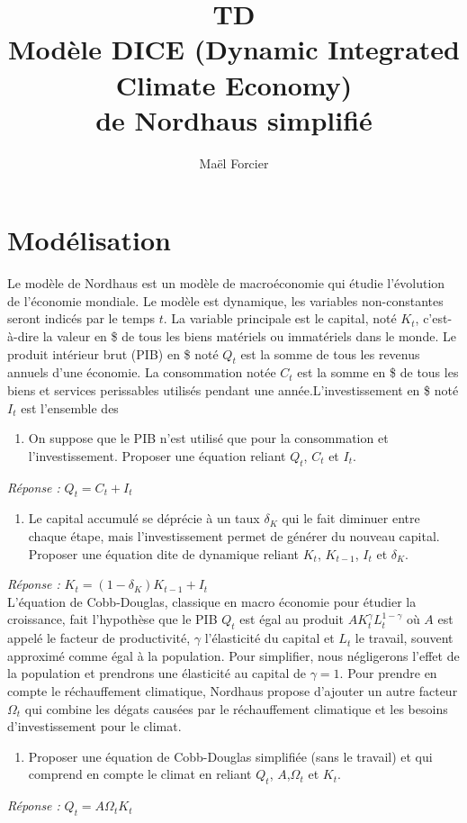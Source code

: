 \documentclass[12pt]{article}
\title{TD \\Modèle 
DICE (Dynamic Integrated Climate Economy) \\
de Nordhaus simplifié }
\author{Maël Forcier}
\theoremstyle{remark}
\begin{document}
\maketitle


\section{Modélisation}

Le modèle de Nordhaus est un modèle de macroéconomie qui étudie l'évolution de l'économie mondiale. Le modèle est dynamique, les variables non-constantes seront indicés par le temps $t$. La variable principale est le capital, noté $K_t$, c'est-à-dire la valeur en \$ de tous les biens matériels ou immatériels dans le monde. Le produit intérieur brut (PIB) en \$ noté $Q_t$ est la somme de tous les revenus annuels d'une économie. La consommation notée $C_t$ est la somme en \$ de tous les biens et services perissables utilisés pendant une année.L'investissement en \$ noté $I_t$ est l'ensemble des 

\begin{enumerate}
\item On suppose que le PIB n'est utilisé que pour la consommation et l'investissement. Proposer une équation reliant $Q_t$, $C_t$ et $I_t$.
\end{enumerate}
\textit{Réponse :} $Q_{t}=C_t + I_t$
\begin{enumerate}[resume]
\item  Le capital accumulé se déprécie à un taux $\delta_K$ qui le fait diminuer entre chaque étape, mais l'investissement permet de générer du nouveau capital. Proposer une équation dite de dynamique reliant $K_{t}$, $K_{t-1}$, $I_t$ et $\delta_K$.
\end{enumerate}
\textit{Réponse :} $K_{t}=(1-\delta_K)K_{t-1}+I_t$\\

L'équation de Cobb-Douglas, classique en macro économie pour étudier la croissance, fait l'hypothèse que le PIB $Q_t$ est égal au produit $AK_t^\gamma L_t^{1-\gamma}$ où $A$ est appelé le facteur de productivité, $\gamma$ l'élasticité du capital et $L_t$ le travail, souvent approximé comme égal à la population. Pour simplifier, nous négligerons l'effet de la population et prendrons une élasticité au capital de $\gamma=1$. Pour prendre en compte le réchauffement climatique, Nordhaus propose d'ajouter un autre facteur $\Omega_t$ qui combine les dégats causées par le réchauffement climatique et les besoins d'investissement pour le climat. 
\begin{enumerate}[resume]
\item  Proposer une équation de Cobb-Douglas simplifiée (sans le travail) et qui comprend en compte le climat en reliant $Q_{t}$, $A$,$\Omega_t$ et $K_{t}$.
\end{enumerate}
\textit{Réponse :} $Q_{t}=A \Omega_t K_t$ \\
\end{document}
